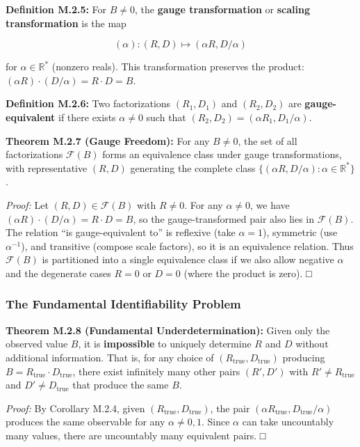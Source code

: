 \documentclass[
]{article}
\begin{document}
\textbf{Definition M.2.5:} For \(B \neq 0\), the \textbf{gauge
transformation} or \textbf{scaling transformation} is the map

\[(\alpha): (R, D) \mapsto (\alpha R, D/\alpha)\]

for \(\alpha \in \mathbb{R}^*\) (nonzero reals). This transformation
preserves the product: \((\alpha R) \cdot (D/\alpha) = R \cdot D = B\).

\textbf{Definition M.2.6:} Two factorizations \((R_1, D_1)\) and
\((R_2, D_2)\) are \textbf{gauge-equivalent} if there exists
\(\alpha \neq 0\) such that \((R_2, D_2) = (\alpha R_1, D_1/\alpha)\).

\textbf{Theorem M.2.7 (Gauge Freedom):} For any \(B \neq 0\), the set of
all factorizations \(\mathcal{F}(B)\) forms an equivalence class under
gauge transformations, with representative \((R, D)\) generating the
complete class \(\{(\alpha R, D/\alpha) : \alpha \in \mathbb{R}^*\}\).

\emph{Proof:} Let \((R, D) \in \mathcal{F}(B)\) with \(R \neq 0\). For
any \(\alpha \neq 0\), we have
\((\alpha R) \cdot (D/\alpha) = R \cdot D = B\), so the
gauge-transformed pair also lies in \(\mathcal{F}(B)\). The relation
``is gauge-equivalent to'' is reflexive (take \(\alpha = 1\)), symmetric
(use \(\alpha^{-1}\)), and transitive (compose scale factors), so it is
an equivalence relation. Thus \(\mathcal{F}(B)\) is partitioned into a
single equivalence class if we also allow negative \(\alpha\) and the
degenerate cases \(R = 0\) or \(D = 0\) (where the product is zero). □

\subsubsection{The Fundamental Identifiability
Problem}\label{the-fundamental-identifiability-problem}

\textbf{Theorem M.2.8 (Fundamental Underdetermination):} Given only the
observed value \(B\), it is \textbf{impossible} to uniquely determine
\(R\) and \(D\) without additional information. That is, for any choice
of \((R_{\text{true}}, D_{\text{true}})\) producing
\(B = R_{\text{true}} \cdot D_{\text{true}}\), there exist infinitely
many other pairs \((R', D')\) with \(R' \neq R_{\text{true}}\) and
\(D' \neq D_{\text{true}}\) that produce the same \(B\).

\emph{Proof:} By Corollary M.2.4, given
\((R_{\text{true}}, D_{\text{true}})\), the pair
\((\alpha R_{\text{true}}, D_{\text{true}}/\alpha)\) produces the same
observable for any \(\alpha \neq 0, 1\). Since \(\alpha\) can take
uncountably many values, there are uncountably many equivalent pairs. □
\end{document}
